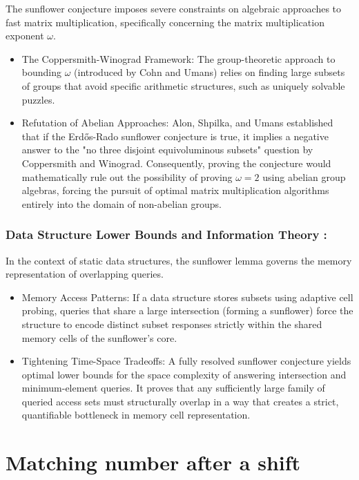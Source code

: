 \documentclass[runningheads,12pt,a4paper]{article}
\begin{document}
The sunflower conjecture imposes severe constraints on algebraic approaches to fast matrix multiplication, specifically concerning the matrix multiplication exponent $\omega$.
\begin{itemize}
\item The Coppersmith-Winograd Framework: The group-theoretic approach to bounding $\omega$ (introduced by Cohn and Umans) relies on finding large subsets of groups that avoid specific arithmetic structures, such as uniquely solvable puzzles.
\item Refutation of Abelian Approaches: Alon, Shpilka, and Umans established that if the Erdős-Rado sunflower conjecture is true, it implies a negative answer to the "no three disjoint equivoluminous subsets" question by Coppersmith and Winograd. Consequently, proving the conjecture would mathematically rule out the possibility of proving $\omega = 2$ using abelian group algebras, forcing the pursuit of optimal matrix multiplication algorithms entirely into the domain of non-abelian groups. 
\end{itemize}

\subsubsection*{ Data Structure Lower Bounds and Information Theory \cite{rao2023}:}

In the context of static data structures, the sunflower lemma governs the memory representation of overlapping queries.
\begin{itemize}
\item Memory Access Patterns: If a data structure stores subsets using adaptive cell probing, queries that share a large intersection (forming a sunflower) force the structure to encode distinct subset responses strictly within the shared memory cells of the sunflower's core.

\item Tightening Time-Space Tradeoffs: A fully resolved sunflower conjecture yields optimal lower bounds for the space complexity of answering intersection and minimum-element queries. It proves that any sufficiently large family of queried access sets must structurally overlap in a way that creates a strict, quantifiable bottleneck in memory cell representation.
\end{itemize}


\appendix
\section{Matching number after a shift}\label{app:1}
\end{document}
